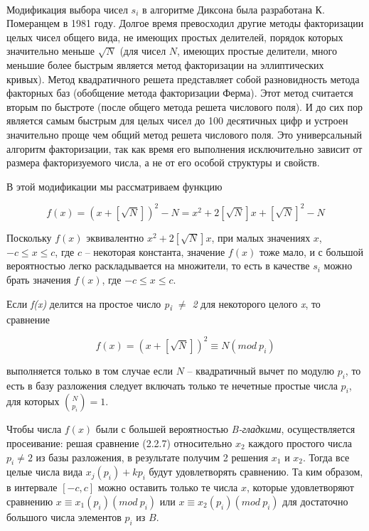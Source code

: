 \paragraph{} Модификация выбора чисел $s_{i}$ в алгоритме Диксона была разработана К. Померанцем в 1981 году. Долгое время 
превосходил другие методы факторизации целых чисел общего вида, не имеющих простых делителей, порядок которых значительно меньше $\sqrt{N}$ 
(для чисел $N$, имеющих простые делители, много меньшие более быстрым является метод факторизации на эллиптических кривых). 
Метод квадратичного решета представляет собой разновидность метода факторных баз (обобщение метода факторизации Ферма). 
Этот метод считается вторым по быстроте (после общего метода решета числового поля). И до сих пор является самым быстрым для 
целых чисел до 100 десятичных цифр и устроен значительно проще чем общий метод решета числового поля. Это универсальный алгоритм факторизации, 
так как время его выполнения исключительно зависит от размера факторизуемого числа, а не от его особой структуры и свойств.

  В этой модификации мы рассматриваем функцию
    
    \begin{equation} \label{eq:prime-fact-fx1}
      f(x) = (x + [\sqrt{N}])^{2} - N = x^{2} + 2[\sqrt{N}]x + [\sqrt{N}]^{2} - N
    \end{equation}
    
  Поскольку $f(x)$ эквивалентно $x^{2} + 2[\sqrt{N}]x$, при малых значениях $x$, $-c \le x \le c$, 
  где $c$ – некоторая константа, значение $f(x)$ тоже мало, и с большой вероятностью легко раскладывается на множители, то есть в 
  качестве $s_{i}$ можно брать значения $f(x)$, где $-c \le x \le c$.
  
  Если \textit{f(x)} делится на простое число \textit{p\textsubscript{i} {$\ne$} 2} для некоторого целого \textit{x}, то сравнение
  
    \begin{equation} \label{eq:prime-fact-fx2}
      f(x) = (x + [\sqrt{N}])^{2} \equiv N(mod \: p_{i})
    \end{equation}
    
  выполняется только в том случае если $N$ – квадратичный вычет по модулю $p_{i}$, то есть в базу разложения следует включать 
  только те нечетные простые числа $p_{i}$, для которых $\binom{N}{p_{i}} = 1$.
  
  Чтобы числа $f(x)$ были с большей вероятностью \textit{B-гладкими}, осуществляется просеивание: решая сравнение (2.2.7) относительно $x_{2}$
  каждого простого числа $p_{i} \ne 2$ из базы разложения, в результате получим 2 решения $x_{1}$ и $x_{2}$. 
  Тогда все целые числа вида $x_{j}(p_{i}) + k p_{i}$ будут удовлетворять сравнению. Та
  ким образом, в 
  интервале $[-c, c]$ можно оставить только те числа $x$, которые удовлетворяют сравнению $x \equiv x_{1}(p_{i})(mod \: p_{i})$ 
  или $x \equiv x_{2}(p_{i})(mod \: p_{i})$ для достаточно большого числа элементов 
  $p_{i}$ из $B$.
  
